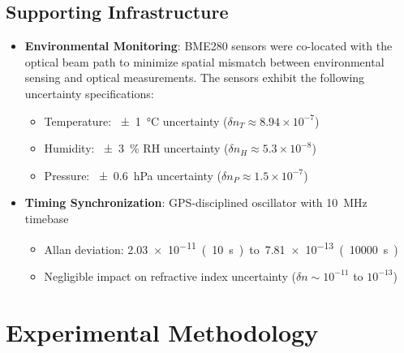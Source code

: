 \documentclass[aip,reprint,groupedaddress,onecolumn,superscriptaddress]{revtex4-2}
\begin{document}
\subsection{Supporting Infrastructure}
\begin{itemize}
    \item \textbf{Environmental Monitoring}: BME280 sensors were co-located with the optical beam path to minimize spatial mismatch between environmental sensing and optical measurements. The sensors exhibit the following uncertainty specifications:
    \begin{itemize}
        \item Temperature: \SI{\pm 1}{\degreeCelsius} uncertainty ($\delta n_T \approx 8.94\times10^{-7}$)
        \item Humidity: \SI{\pm 3}{\percent} RH uncertainty ($\delta n_H \approx 5.3\times10^{-8}$)
        \item Pressure: \SI{\pm 0.6}{\hecto\pascal} uncertainty ($\delta n_P \approx 1.5\times10^{-7}$)
    \end{itemize}
    
    \item \textbf{Timing Synchronization}: GPS-disciplined oscillator with \SI{10}{\mega\hertz} timebase
    \begin{itemize}
        \item Allan deviation: \SI{2.03e-11} (10 s) to \SI{7.81e-13} (10000 s)
        \item Negligible impact on refractive index uncertainty ($\delta n \sim 10^{-11}$ to $10^{-13}$)
    \end{itemize}
\end{itemize}

\section{Experimental Methodology}
\end{document}
